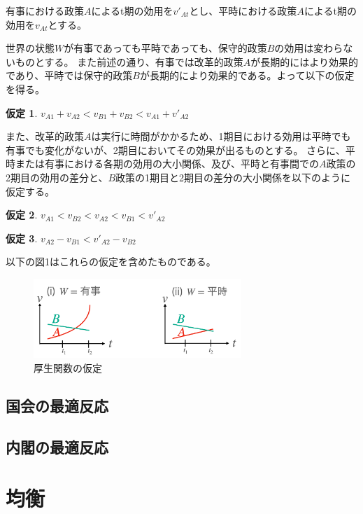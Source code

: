 \documentclass[uplatex,a4j,11pt]{jsarticle}
\theoremstyle{roman}
\newtheorem{assumption}{仮定}
\begin{document}
有事における政策$A$によるt期の効用を$v'_{At}$とし、平時における政策$A$によるt期の効用を$v_{At}$とする。

世界の状態$W$が有事であっても平時であっても、保守的政策$B$の効用は変わらないものとする。
また前述の通り、有事では改革的政策$A$が長期的にはより効果的であり、平時では保守的政策$B$が長期的により効果的である。よって以下の仮定を得る。
\begin{assumption}  $v_{A1} + v_{A2}<v_{B1} + v_{B2} <  v_{A1} + v'_{A2}$ \end{assumption}


また、改革的政策$A$は実行に時間がかかるため、1期目における効用は平時でも有事でも変化がないが、2期目においてその効果が出るものとする。
さらに、平時または有事における各期の効用の大小関係、及び、平時と有事間での$A$政策の2期目の効用の差分と、$B$政策の1期目と2期目の差分の大小関係を以下のように仮定する。
\begin{assumption}  $v_{A1} < v_{B2} < v_{A2} < v_{B1} < v'_{A2}$  \end{assumption}
\begin{assumption}  $v_{A2} - v_{B1} < v'_{A2} - v_{B2}$  \end{assumption}

以下の図1はこれらの仮定を含めたものである。
\begin{figure}[htbp]
  \centering
  \includegraphics[width=0.7\textwidth]{./image/assumption_welfare_policy.png}
  \caption{厚生関数の仮定} 
  \label{fig:assumption_welfare_policy}
\end{figure}


\subsection{国会の最適反応}

\subsection{内閣の最適反応}



\theendnotes %
\section{均衡}
\end{document}
